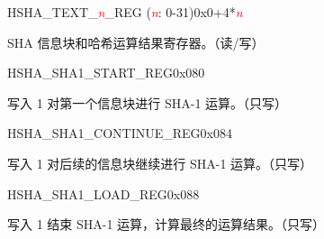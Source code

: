 \begin{register}{H}{SHA\_TEXT\_\textit{\textcolor{red}{\it{n}}}\_REG (\textit{\textcolor{red}{\it{n}}}: 0-31)}{0x0+4*\textit{\textcolor{red}{\it{n}}}}\label{regdesc:SHATEXTnREG}
%
\regnewline%
\begin{regdesc}\begin{reglist}
\item [SHA\_TEXT\_\textit{\textcolor{red}{\it{n}}}\_REG (\textit{\textcolor{red}{\it{n}}}: 0-31)]SHA 信息块和哈希运算结果寄存器。（读/写）
\end{reglist}\end{regdesc}
\end{register}


\begin{register}{H}{SHA\_SHA1\_START\_REG}{0x080}\label{regdesc:SHASHA1STARTREG}
%
%
\regnewline%
\begin{regdesc}\begin{reglist}
\item [SHA\_SHA1\_START] 写入 1 对第一个信息块进行 SHA-1 运算。（只写）
\end{reglist}\end{regdesc}
\end{register}


\begin{register}{H}{SHA\_SHA1\_CONTINUE\_REG}{0x084}\label{regdesc:SHASHA1CONTINUEREG}
%
%
\regnewline%
\begin{regdesc}\begin{reglist}
\item [SHA\_SHA1\_CONTINUE] 写入 1 对后续的信息块继续进行 SHA-1 运算。（只写）
\end{reglist}\end{regdesc}
\end{register}


\begin{register}{H}{SHA\_SHA1\_LOAD\_REG}{0x088}\label{regdesc:SHASHA1LOADREG}
%
%
\regnewline%
\begin{regdesc}\begin{reglist}
\item [SHA\_SHA1\_LOAD] 写入 1 结束 SHA-1 运算，计算最终的运算结果。（只写）
\end{reglist}\end{regdesc}
\end{register}


